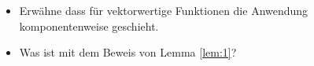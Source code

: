 \documentclass[a4paper]{scrartcl}
\newcommand{\real}{\mathbb{R}}
\newcommand{\ubold}{\boldsymbol{u}}
\newcommand{\fbold}{\boldsymbol{f}}
\newcommand{\dx}{\,dx}
\DeclareMathOperator{\divOp}{div}
\theoremstyle{plain}
\theoremstyle{definition}
\newtheorem{modellproblem}{Modellproblem}
\theoremstyle{remark}
\begin{document}
{\color{red}
  \begin{itemize}
  \item Erwähne dass für vektorwertige Funktionen die Anwendung
    komponentenweise geschieht.
  \item Was ist mit dem Beweis von Lemma \ref{lem:1}? 
  \end{itemize}
}







\end{document}
